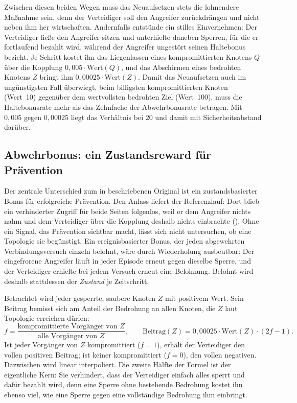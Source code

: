 Zwischen diesen beiden Wegen muss das Neuaufsetzen stets die lohnendere
Maßnahme sein,
denn der Verteidiger soll den Angreifer zurückdrängen und nicht neben ihm her
wirtschaften. Andernfalls entstünde ein stilles Einvernehmen: Der Verteidiger
ließe den Angreifer sitzen und unterhielte daneben Sperren, für die er
fortlaufend bezahlt wird, während der Angreifer ungestört seinen Haltebonus
bezieht. Je Schritt kostet ihn das Liegenlassen eines kompromittierten Knotens
$Q$ über die Kopplung $0{,}005 \cdot \text{Wert}(Q)$, und das Abschirmen eines
bedrohten Knotens $Z$ bringt ihm $0{,}00025 \cdot \text{Wert}(Z)$. Damit das
Neuaufsetzen auch im ungünstigsten Fall überwiegt, beim billigsten
kompromittierten Knoten (Wert~10) gegenüber dem wertvollsten bedrohten Ziel
(Wert~100), muss die Haltebonusrate mehr als das Zehnfache der Abwehrbonusrate
betragen. Mit $0{,}005$ gegen $0{,}00025$ liegt das Verhältnis bei 20 und damit
mit Sicherheitsabstand darüber.

\subsection{Abwehrbonus: ein Zustandsreward für Prävention}
\label{sec:abwehrbonus}

Der zentrale Unterschied zum in  beschriebenen
Original ist ein zustandsbasierter Bonus für erfolgreiche Prävention. Den
Anlass liefert der Referenzlauf: Dort blieb ein verhinderter Zugriff für beide
Seiten folgenlos, weil er dem Angreifer nichts nahm und dem Verteidiger über
die Kopplung deshalb nichts einbrachte (). Ohne ein
Signal, das Prävention sichtbar macht, lässt sich nicht untersuchen, ob eine
Topologie sie begünstigt. Ein
ereignisbasierter Bonus, der jeden abgewehrten Verbindungsversuch einzeln
belohnt, wäre durch Wiederholung ausbeutbar: Der eingefrorene Angreifer läuft in
jeder Episode erneut gegen dieselbe Sperre, und der Verteidiger erhielte bei
jedem Versuch erneut eine Belohnung. Belohnt wird deshalb stattdessen der \emph{Zustand}
je Zeitschritt.

Betrachtet wird jeder gesperrte, saubere Knoten $Z$ mit positivem Wert. Sein
Beitrag bemisst sich am Anteil der Bedrohung an allen Knoten, die $Z$ laut
Topologie erreichen dürfen:
%
\begin{equation}
  f = \frac{\text{kompromittierte Vorgänger von } Z}
           {\text{alle Vorgänger von } Z},
  \qquad
  \text{Beitrag}(Z) = 0{,}00025 \cdot \text{Wert}(Z) \cdot (2f - 1).
  \label{eq:abwehrbonus}
\end{equation}
%
Ist jeder Vorgänger von $Z$ kompromittiert ($f=1$), erhält der Verteidiger den
vollen positiven Beitrag; ist keiner kompromittiert ($f=0$), den vollen
negativen. Dazwischen wird linear interpoliert. Die zweite Hälfte der Formel
ist der eigentliche Kern: Sie verhindert, dass der Verteidiger einfach alles
sperrt und dafür bezahlt wird, denn eine Sperre ohne bestehende Bedrohung
kostet ihn ebenso viel, wie eine Sperre gegen eine vollständige Bedrohung ihm
einbringt.

